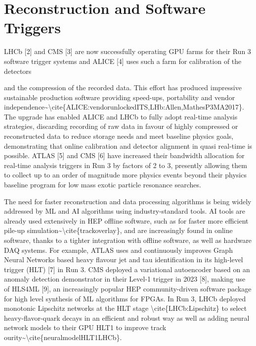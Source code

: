 \section{Reconstruction and Software
Triggers}\label{reconstruction-and-software-triggers}

LHCb {[}2{]} and CMS {[}3{]} are now successfully operating GPU farms
for their Run 3 software trigger systems and ALICE {[}4{]} uses such a
farm for calibration of the detectors

and the compression of the recorded data. This effort has produced
impressive sustainable production software providing speed-ups,
portability and vendor
independence\textasciitilde\textbackslash cite\{ALICE:vendorunlockedITS,LHb:Allen,MathesP3MA2017\}.
The upgrade has enabled ALICE and LHCb to fully adopt real-time analysis
strategies, discarding recording of raw data in favour of highly
compressed or reconstructed data to reduce storage needs and meet
baseline physics goals, demonstrating that online calibration and
detector alignment in quasi real-time is possible. ATLAS {[}5{]} and CMS
{[}6{]} have increased their bandwidth allocation for real-time analysis
triggers in Run 3 by factors of 2 to 3, presently allowing them to
collect up to an order of magnitude more physics events beyond their
physics baseline program for low mass exotic particle resonance
searches.

The need for faster reconstruction and data processing algorithms is
being widely addressed by ML and AI algorithms using industry-standard
tools. AI tools are already used extensively in HEP offline software,
such as for faster more efficient pile-up
simulation\textasciitilde\textbackslash cite\{trackoverlay\}, and are
increasingly found in online software, thanks to a tighter integration
with offline software, as well as hardware DAQ systems. For example,
ATLAS uses and continuously improves Graph Neural Networks based heavy
flavour jet and tau identification in its high-level trigger (HLT)
{[}7{]} in Run 3. CMS deployed a variational autoencoder based on an
anomaly detection demonstrator in their Level-1 trigger in 2023 {[}8{]},
making use of HLS4ML {[}9{]}, an increasingly popular HEP
community-driven software package for high level synthesis of ML
algorithms for FPGAs. In Run 3, LHCb deployed monotonic Lipschitz
networks at the HLT stage \textbackslash cite\{LHCb:Lipschitz\} to
select heavy-flavor-quark decays in an efficient and robust way as well
as adding neural network models to their GPU HLT1 to improve track
ourity\textasciitilde\textbackslash cite\{neuralmodelHLT1LHCb\}.

